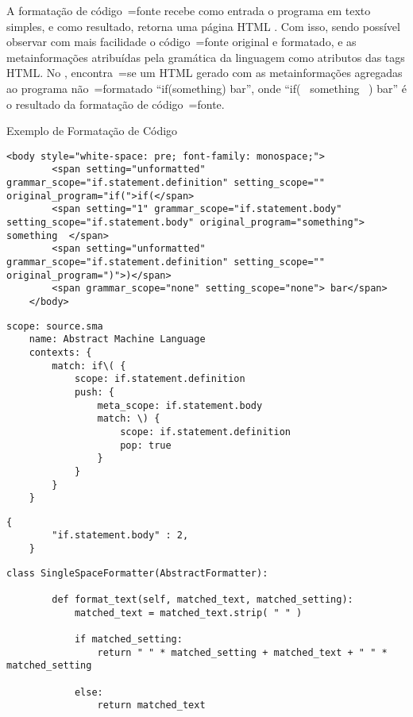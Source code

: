 A formatação de código~=fonte recebe como entrada o programa em texto simples,
e como resultado,
retorna uma página HTML \cite{parallelParserForHTML}.
Com isso,
sendo possível observar com mais facilidade o código~=fonte original e
formatado,
e as metainformações atribuídas pela gramática da linguagem como atributos das tags HTML.
No ,
encontra~=se um HTML gerado com as metainformações agregadas ao programa não~=formatado ``if(something) bar'',
onde ``if( \ something \ ) bar'' é o resultado da formatação de código~=fonte.
\begin{quadro}[h]
\caption{Exemplo de Formatação de Código}
\label{exemploDeFormatacaoDeCodigo}
\begin{bluebox}
\lstset{xleftmargin=2em,aboveskip=0pt}

    \begin{lstlisting}[caption={Exemplo de HTML Gerado pelo Formatador de Código},label={exemploDeHTMLGerado},style=HTML5]
    <body style="white-space: pre; font-family: monospace;">
        <span setting="unformatted" grammar_scope="if.statement.definition" setting_scope="" original_program="if(">if(</span>
        <span setting="1" grammar_scope="if.statement.body" setting_scope="if.statement.body" original_program="something">  something  </span>
        <span setting="unformatted" grammar_scope="if.statement.definition" setting_scope="" original_program=")">)</span>
        <span grammar_scope="none" setting_scope="none"> bar</span>
    </body>
    \end{lstlisting}
    \begin{lstlisting}[caption={Exemplo de Gramática Utilizada pelo Formatador de Código},label={exemploDeGramaticaUtilizada},style=yaml_style]
    scope: source.sma
    name: Abstract Machine Language
    contexts: {
        match: if\( {
            scope: if.statement.definition
            push: {
                meta_scope: if.statement.body
                match: \) {
                    scope: if.statement.definition
                    pop: true
                }
            }
        }
    }
    \end{lstlisting}
    \begin{lstlisting}[caption={Exemplo de Configuração Utilizada pelo Formatador de Código},label={exemploDeConfiguracaoUtilizada},style=python_style]
    {
        "if.statement.body" : 2,
    }
    \end{lstlisting}
    \begin{lstlisting}[caption={Exemplo de Formatador de Código},label={exemploDeFormatadorDeCodigo},style=python_style]
    class SingleSpaceFormatter(AbstractFormatter):

        def format_text(self, matched_text, matched_setting):
            matched_text = matched_text.strip( " " )

            if matched_setting:
                return " " * matched_setting + matched_text + " " * matched_setting

            else:
                return matched_text
    \end{lstlisting}
\end{bluebox}
\end{quadro}

